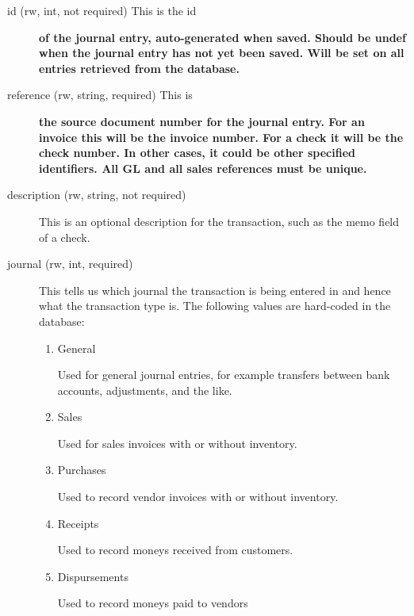 \begin{description}
\begin{description}
\begin{description}
\begin{description}
\begin{description}
\begin{description}
\begin{description}
\begin{description}
\begin{description}
\item[{id (rw, int, not required) This is the id}] \textbf{of the journal entry, auto-generated when saved. Should be undef when the journal entry has not yet been saved. Will be set on all entries retrieved from the database.}
\item[{reference (rw, string, required) This is}] \textbf{the source document number for the journal entry. For an invoice this will be the invoice number. For a check it will be the check number. In other cases, it could be other specified identifiers. All GL and all sales references must be unique.}
\item[{description (rw, string, not required)}] \mbox{}

This is an optional description for the transaction, such as the memo field
of a check.


\item[{journal (rw, int, required)}] \mbox{}

This tells us which journal the transaction is being entered in and hence what 
the transaction type is.  The following values are hard-coded in the database:

\begin{enumerate}

\item General

Used for general journal entries, for example transfers between bank accounts,
adjustments, and the like.


\item Sales

Used for sales invoices with or without inventory.


\item Purchases

Used to record vendor invoices with or without inventory.


\item Receipts

Used to record moneys received from customers.


\item Dispursements

Used to record moneys paid to vendors

\end{enumerate}


\end{description}
\end{description}
\end{description}
\end{description}
\end{description}
\end{description}
\end{description}
\end{description}
\end{description}
